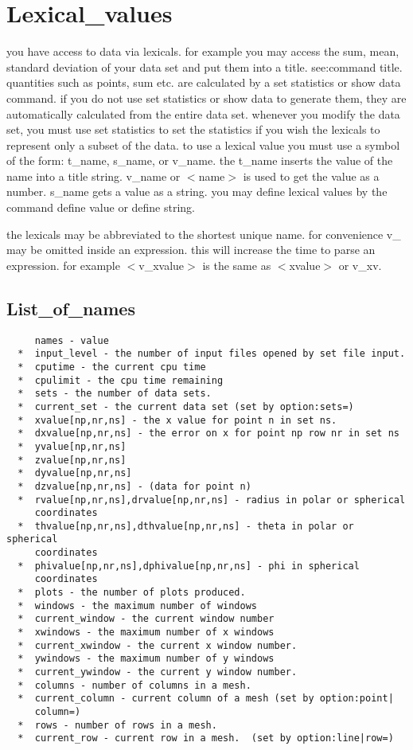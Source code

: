 \section{Lexical\_values}
you  have access to data via lexicals.  for example you may access the sum,
mean, standard deviation of your data  set  and  put  them  into  a  title.
see:command title.   quantities such as points, sum etc.  are calculated by
a set statistics or show data command.  if you do not use set statistics or
show  data  to  generate  them,  they are automatically calculated from the
entire data set.  whenever you modify  the  data  set,  you  must  use  set
statistics to set the statistics if you wish the lexicals to represent only
a subset of the data.  to use a lexical value you must use a symbol of  the
form:  t\_name, s\_name, or v\_name.  the t\_name inserts the value of the name
into a title string.  v\_name or $<$name$>$ is  used  to  get  the  value  as  a
number.  s\_name gets a value as a string.  you may define lexical values by
the command define value or define string.  

the  lexicals  may  be  abbreviated  to  the  shortest  unique  name.   for
convenience v\_ may be omitted inside an expression.  this will increase the
time  to  parse  an  expression.   for  example  $<$v\_xvalue$>$  is the same as
$<$xvalue$>$ or v\_xv.  
\subsection{List\_of\_names}
\begin{verbatim}
     names - value 
  *  input_level - the number of input files opened by set file input.  
  *  cputime - the current cpu time 
  *  cpulimit - the cpu time remaining 
  *  sets - the number of data sets.  
  *  current_set - the current data set (set by option:sets=) 
  *  xvalue[np,nr,ns] - the x value for point n in set ns.  
  *  dxvalue[np,nr,ns] - the error on x for point np row nr in set ns 
  *  yvalue[np,nr,ns] 
  *  zvalue[np,nr,ns] 
  *  dyvalue[np,nr,ns] 
  *  dzvalue[np,nr,ns] - (data for point n) 
  *  rvalue[np,nr,ns],drvalue[np,nr,ns] - radius in polar or spherical
     coordinates 
  *  thvalue[np,nr,ns],dthvalue[np,nr,ns] - theta in polar or spherical
     coordinates 
  *  phivalue[np,nr,ns],dphivalue[np,nr,ns] - phi in spherical
     coordinates 
  *  plots - the number of plots produced.  
  *  windows - the maximum number of windows 
  *  current_window - the current window number 
  *  xwindows - the maximum number of x windows 
  *  current_xwindow - the current x window number.  
  *  ywindows - the maximum number of y windows 
  *  current_ywindow - the current y window number.  
  *  columns - number of columns in a mesh.  
  *  current_column - current column of a mesh (set by option:point|
     column=) 
  *  rows - number of rows in a mesh.  
  *  current_row - current row in a mesh.  (set by option:line|row=) 
\end{verbatim}

